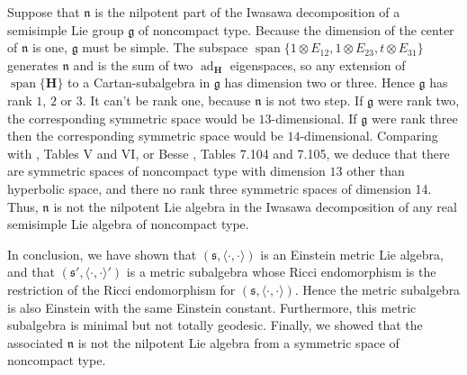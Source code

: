 \documentclass[12pt]{amsart}
\newcommand{\bfH}{\ensuremath{\mathbf H} }
\newcommand{\myspan}{\operatorname{span}}
\newcommand{\frakg}{\ensuremath{\mathfrak{g}} }
\newcommand{\frakn}{\ensuremath{\mathfrak{n}} }
\newcommand{\fraks}{\ensuremath{\mathfrak{s}} }
\newcommand\ip{{\langle\cdot {,} \cdot\rangle}}
\newcommand\ad{\operatorname{ad}}
\theoremstyle{plain}
\theoremstyle{definition}
\theoremstyle{remark}
\numberwithin{equation}{section}
\numberwithin{theorem}{section}
\begin{document}
Suppose that $\frakn$ is the nilpotent part of the Iwasawa decomposition 
of a semisimple Lie group $\frakg$ of noncompact type. Because the dimension of the center of $\frakn$ is one,  
$\frakg$  must be simple. 
The  subspace $\myspan \{ 1 \otimes E_{12}, 1 \otimes E_{23}, 
t \otimes E_{31}  \}$ generates $\frakn$ and 
is the sum of two $\ad_{\bfH}$ eigenspaces, so any 
extension of $\myspan \{ \bfH \}$  to a Cartan-subalgebra in $\frakg$ has dimension two or three. Hence $\frakg$ has rank $1$, $2$ or $3.$ 
It can't be rank one, because $\frakn$  is not two step.  If $\frakg$
were rank two, the corresponding symmetric space would be 
$13$-dimensional. If $\frakg$ were rank three then the 
corresponding symmetric space would be $14$-dimensional.  
Comparing with \cite{helgason-78}, Tables V and VI,
or Besse \cite{besse-87}, Tables 7.104 and 7.105, we deduce that 
there are  symmetric spaces of noncompact type with 
dimension $13$ other than hyperbolic space, and there no rank three
symmetric spaces of dimension 14. Thus, $\frakn$ is not the nilpotent Lie algebra in the Iwasawa decomposition of any real  semisimple Lie algebra of noncompact type.   

In conclusion, we have shown that $(\fraks, \ip)$ is an Einstein metric Lie
algebra, and that $(\fraks', \ip')$ is a metric
subalgebra  whose 
Ricci endomorphism is the restriction of the Ricci endomorphism for
$(\fraks, \ip)$.  Hence the metric 
subalgebra is also Einstein with  the same
Einstein constant. Furthermore, this metric subalgebra is minimal but 
not totally geodesic.  Finally, we  showed that the associated $\frakn$ 
is not the nilpotent Lie algebra from a symmetric space of noncompact type.



 
 
\end{document}
